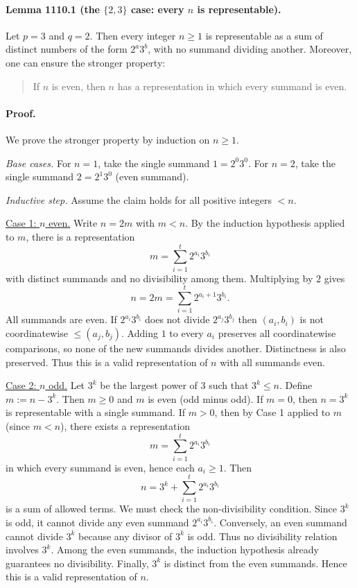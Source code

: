 \paragraph{Lemma 1110.1 (the $\{2,3\}$ case: every $n$ is representable).}
Let $p=3$ and $q=2$.
Then every integer $n\ge 1$ is representable as a sum of distinct numbers of the form $2^a3^b$, with no summand dividing another.
Moreover, one can ensure the stronger property:
\begin{quote}
If $n$ is even, then $n$ has a representation in which every summand is even.
\end{quote}

\paragraph{Proof.}
We prove the stronger property by induction on $n\ge 1$.

\emph{Base cases.}
For $n=1$, take the single summand $1=2^0 3^0$.
For $n=2$, take the single summand $2=2^1 3^0$ (even summand).

\emph{Inductive step.}
Assume the claim holds for all positive integers $<n$.

\underline{Case 1: $n$ even.}
Write $n=2m$ with $m<n$.
By the induction hypothesis applied to $m$, there is a representation
\[m=\sum_{i=1}^t 2^{a_i}3^{b_i}
\]
with distinct summands and no divisibility among them.
Multiplying by $2$ gives
\[n=2m=\sum_{i=1}^t 2^{a_i+1}3^{b_i}.
\]
All summands are even.
If $2^{a_i}3^{b_i}$ does not divide $2^{a_j}3^{b_j}$ then $(a_i,b_i)$ is not coordinatewise $\le (a_j,b_j)$.
Adding $1$ to every $a_i$ preserves all coordinatewise comparisons, so none of the new summands divides another.
Distinctness is also preserved.
Thus this is a valid representation of $n$ with all summands even.

\underline{Case 2: $n$ odd.}
Let $3^k$ be the largest power of $3$ such that $3^k\le n$.
Define $m:=n-3^k$.
Then $m\ge 0$ and $m$ is even (odd minus odd).
If $m=0$, then $n=3^k$ is representable with a single summand.
If $m>0$, then by Case 1 applied to $m$ (since $m<n$), there exists a representation
\[m=\sum_{i=1}^t 2^{a_i}3^{b_i}
\]
in which every summand is even, hence each $a_i\ge 1$.
Then
\[n=3^k + \sum_{i=1}^t 2^{a_i}3^{b_i}
\]
is a sum of allowed terms.
We must check the non-divisibility condition.
Since $3^k$ is odd, it cannot divide any even summand $2^{a_i}3^{b_i}$.
Conversely, an even summand cannot divide $3^k$ because any divisor of $3^k$ is odd.
Thus no divisibility relation involves $3^k$.
Among the even summands, the induction hypothesis already guarantees no divisibility.
Finally, $3^k$ is distinct from the even summands.
Hence this is a valid representation of $n$.

